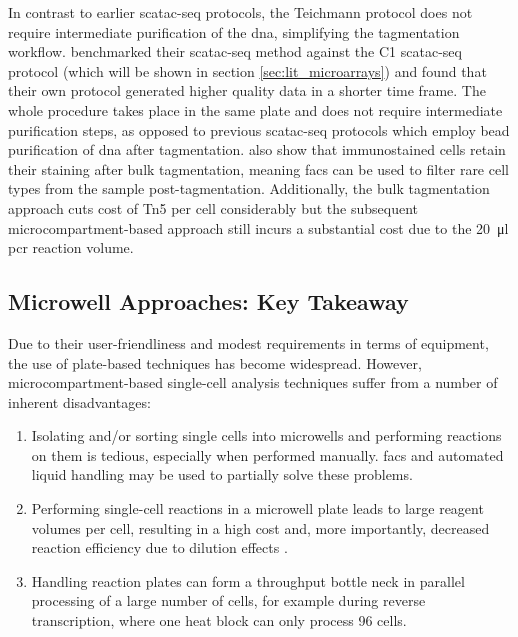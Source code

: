 In contrast to earlier \acrshort{scatac-seq} protocols, the Teichmann protocol does not require intermediate purification of the \acrshort{dna}, simplifying the tagmentation workflow. \citeauthor{chen2018} benchmarked their \acrshort{scatac-seq} method against the \citeauthor{buenrostro2015} C1 \acrshort{scatac-seq} protocol (which will be shown in section \ref{sec:lit_microarrays}) and found that their own protocol generated higher quality data in a shorter time frame. The whole procedure takes place in the same plate and does not require intermediate purification steps, as opposed to previous \acrshort{scatac-seq} protocols which employ bead purification of \acrshort{dna} after tagmentation. \citeauthor{chen2018} also show that immunostained cells retain their staining after bulk tagmentation, meaning \acrshort{facs} can be used to filter rare cell types from the sample post-tagmentation. Additionally, the bulk tagmentation approach cuts cost of Tn5 per cell considerably but the subsequent microcompartment-based approach still incurs a substantial cost due to the \SI{20}{\micro\litre} \acrshort{pcr} reaction volume.\pms


\newpage
\subsection{Microwell Approaches: Key Takeaway}
Due to their user-friendliness and modest requirements in terms of equipment, the use of plate-based techniques has become widespread. However, microcompartment-based single-cell analysis techniques suffer from a number of inherent disadvantages:

\begin{enumerate}
	\setlength{\itemsep}{0pt}%
	\setlength{\parskip}{0pt}%
	\item Isolating and/or sorting single cells into microwells and performing reactions on them is tedious, especially when performed manually. \acrshort{facs} and automated liquid handling may be used to partially solve these problems.
	\item Performing single-cell reactions in a microwell plate leads to large reagent volumes per cell, resulting in a high cost and, more importantly, decreased reaction efficiency due to dilution effects \citep{wu2014}.
	\item Handling reaction plates can form a throughput bottle neck in parallel processing of a large number of cells, for example during reverse transcription, where one heat block can only process 96 cells.
\end{enumerate}

